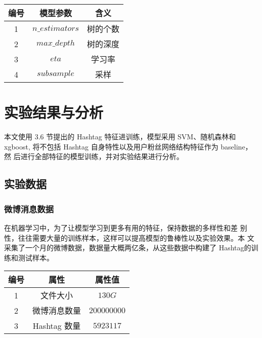 \begin{table}[H]
    \centering
    \footnotesize%
      \label{tab:3_1}
    \setlength{\tabcolsep}{30pt}%
    \renewcommand{\arraystretch}{1.2}%
    \begin{tabular}{ccc}
        \hline
        \textbf{编号} & \textbf{模型参数} & \textbf{含义} \\
        \hline
         1 & $n\_estimators$ & 树的个数 \\
         2 & $max\_depth$ &  树的深度\\
         3 & $eta$ & 学习率\\
         4 & $subsample$ & 采样\\ 
        	\hline
    \end{tabular}
    
\end{table}


\section{实验结果与分析}

本文使用 3.6 节提出的 Hashtag 特征进训练，模型采用 SVM、随机森林和 xgboost, 将不包括 Hashtag 自身特性以及用户粉丝网络结构特征作为 baseline，然 后进行全部特征的模型训练，并对实验结果进行分析。

\subsection{实验数据}
\subsubsection{微博消息数据}
在机器学习中，为了让模型学习到更多有用的特征，保持数据的多样性和差 别性，往往需要大量的训练样本，这样可以提高模型的鲁棒性以及实验效果。本 文采集了一个月的微博数据，数据量大概两亿条，从这些数据中构建了 Hashtag的训练和测试样本。

\begin{table}[H]
    \centering
    \footnotesize%
      \label{tab:3_2}
    \setlength{\tabcolsep}{30pt}%
    \renewcommand{\arraystretch}{1.2}%
    \begin{tabular}{ccc}
        \hline
        \textbf{编号} & \textbf{属性} & \textbf{属性值} \\
        \hline
         1 & 文件大小& $130G$ \\
         2 & 微博消息数量& $200000000$\\
         3 & Hashtag 数量& $5923117$ \\
        	\hline
    \end{tabular}
    
\end{table}


